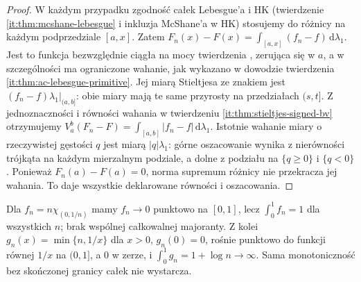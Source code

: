 \begin{proof}
W każdym przypadku zgodność całek Lebesgue'a i HK
(twierdzenie \ref{it:thm:mcshane-lebesgue} i inkluzja
McShane'a w HK) stosujemy do różnicy na każdym
podprzedziale $[a,x]$. Zatem
$F_n(x)-F(x)=\int_{[a,x]}(f_n-f)\,\mathrm d\lambda_1$.
Jest to funkcja bezwzględnie ciągła na mocy
twierdzenia , zerująca się w $a$,
a w szczególności ma ograniczone wahanie, jak wykazano
w dowodzie twierdzenia \ref{it:thm:ac-lebesgue-primitive}.
Jej miarą Stieltjesa ze znakiem jest
$(f_n-f)\lambda_1|_{(a,b]}$: obie miary mają
te same przyrosty na przedziałach $(s,t]$.
Z jednoznaczności i równości wahania w twierdzeniu
\ref{it:thm:stieltjes-signed-bv} otrzymujemy
$V_a^b(F_n-F)=\int_{[a,b]}|f_n-f|\,\mathrm d\lambda_1$.
Istotnie wahanie miary o rzeczywistej gęstości $q$
jest miarą $|q|\lambda_1$: górne oszacowanie wynika
z nierówności trójkąta na każdym mierzalnym podziale,
a dolne z podziału na $\{q\ge0\}$ i $\{q<0\}$.
Ponieważ $F_n(a)-F(a)=0$, norma supremum różnicy
nie przekracza jej wahania. To daje wszystkie
deklarowane równości i oszacowania.
\end{proof}
\begin{przyklad}
Dla $f_n=n\chi_{(0,1/n)}$ mamy $f_n\to0$ punktowo na $[0,1]$, lecz $\int_0^1f_n=1$ dla wszystkich $n$; brak wspólnej całkowalnej majoranty. Z kolei $g_n(x)=\min\{n,1/x\}$ dla $x>0$, $g_n(0)=0$, rośnie punktowo do funkcji równej $1/x$ na $(0,1]$, a $0$ w zerze, i $\int_0^1g_n=1+\log n\to\infty$. Sama monotoniczność bez skończonej granicy całek nie wystarcza.
\end{przyklad}

